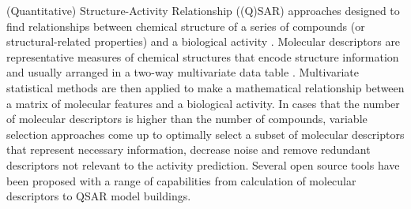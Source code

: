 (Quantitative) Structure-Activity Relationship ((Q)SAR) approaches designed to find relationships between chemical structure of a series of compounds (or structural-related properties) and a biological activity \cite{1995}. Molecular descriptors are representative measures of chemical structures that encode structure information and usually arranged in a two-way multivariate data table \cite{Consonni_2009}. Multivariate statistical methods are then applied to make a mathematical relationship between a matrix of molecular features and a biological activity. In cases that the number of molecular descriptors is higher than the number of compounds, variable selection approaches come up to optimally select a subset of molecular descriptors that represent necessary information, decrease noise and remove redundant descriptors not relevant to the activity prediction. Several open source tools have been proposed with a range of capabilities from calculation of molecular descriptors to QSAR model buildings. 